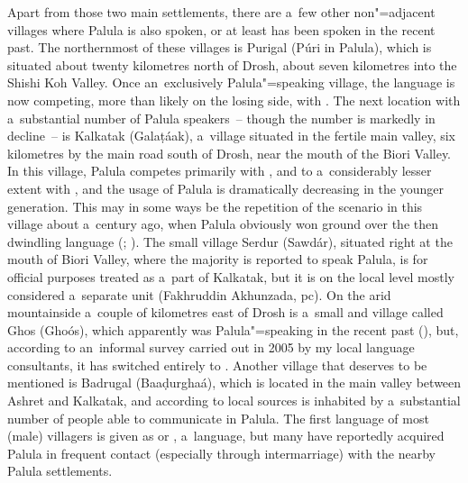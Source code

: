 Apart from those two main settlements, there are a~few other non"=adjacent villages where Palula is also spoken, or at least has been spoken in the recent past. The northernmost of these villages is Purigal (Púri in Palula), which is situated about twenty kilometres north of Drosh, about seven kilometres into the Shishi Koh Valley. Once an~exclusively Palula"=speaking village, the language is now competing, more than likely on the losing side, with \iliKhowar. The next location with a~substantial number of Palula speakers~-- though the number is markedly in decline~-- is Kalkatak (Galaṭáak), a~village situated in the fertile main valley, six kilometres by the main road south of Drosh, near the mouth of the Biori Valley. In this village, Palula competes primarily with \iliKhowar, and to a~considerably lesser extent with \iliPashto, and the usage of Palula is dramatically decreasing in the younger generation. This may in some ways be the repetition of the scenario in this village about a~century ago, when Palula obviously won ground over the then dwindling \iliKalasha language (\citealt[165]{decker1996}; \citealt[95]{cacopardo2001}). The small village Serdur (Sawdár), situated right at the mouth of Biori Valley, where the majority is reported to speak Palula, is for official purposes treated as a~part of Kalkatak, but it is on the local level mostly considered a~separate unit (Fakhruddin Akhunzada, pc). On the arid mountainside a~couple of kilometres east of Drosh is a~small and  village called Ghos (Ghoós), which apparently was Palula"=speaking in the recent past (\citealt[75, 84]{decker1992a}), but, according to an~informal survey carried out in 2005 by my local language consultants, it has switched entirely to \iliKhowar. Another village that deserves to be mentioned is Badrugal (Baaḍurghaá), which is located in the main valley between Ashret and Kalkatak, and according to local sources is inhabited by a~substantial number of people able to communicate in Palula. The first language of most (male) villagers is given as \iliShekhani or \iliShekhwar, a~\iliNuristani language, but many have reportedly acquired Palula in frequent contact (especially through intermarriage) with the nearby Palula settlements. 



